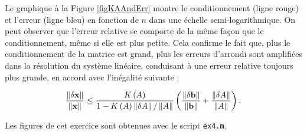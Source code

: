 \begin{enumerate}[label=\alph*)]
Le graphique à la Figure \ref{figKAAndErr} montre le conditionnement (ligne rouge) et l'erreur (ligne bleu) en fonction de $n$ dans une échelle semi-logarithmique.
On peut observer que l'erreur relative se comporte de la même façon que le conditionnement, même si elle est plus petite.
Cela confirme le fait que, plus le conditionnement de la matrice est grand, plus les erreurs d'arrondi sont amplifiées dans la résolution du système linéaire, conduisant à une erreur relative toujours plus grande, en accord avec l'inégalité suivante :

\begin{equation*}
  \dfrac{\left\lVert\delta \mathbf{x}\right\rVert}{\left\lVert\mathbf{x}\right\rVert}
  \leq \dfrac{K\left(A\right)}{1 - K\left(A\right) \left\lVert\delta A\right\rVert / \left\lVert A\right\rVert}
  \left(\dfrac{\left\lVert\delta \mathbf{b}\right\rVert}{\left\lVert\mathbf{b}\right\rVert} + \dfrac{\left\lVert\delta A\right\rVert}{\left\lVert A\right\rVert}\right)
  .
\end{equation*}

Les figures de cet exercice sont obtenues avec le script \texttt{ex4.m}.


    
      

\end{enumerate}



